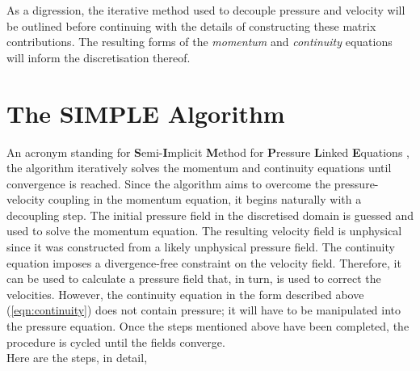 \documentclass[final,3p,times,twocolumn]{elsarticle}
\begin{document}
As a digression, the iterative method used to decouple pressure and velocity will be outlined before continuing with the details of constructing these matrix contributions. The resulting forms of the \textit{momentum} and \textit{continuity} equations will inform the discretisation thereof. 

\section{The SIMPLE Algorithm}
An acronym standing for \textbf{S}emi-\textbf{I}mplicit \textbf{M}ethod for \textbf{P}ressure \textbf{L}inked \textbf{E}quations \cite{Patankar1972AFLOWS}, the algorithm iteratively solves the momentum and continuity equations until convergence is reached. Since the algorithm aims to overcome the pressure-velocity coupling in the momentum equation, it begins naturally with a decoupling step. The initial pressure field in the discretised domain is guessed and used to solve the momentum equation. The resulting velocity field is unphysical since it was constructed from a likely unphysical pressure field. The continuity equation imposes a divergence-free constraint on the velocity field. Therefore, it can be used to calculate a pressure field that, in turn, is used to correct the velocities. However, the continuity equation in the form described above (\ref{eqn:continuity}) does not contain pressure; it will have to be manipulated into the pressure equation. Once the steps mentioned above have been completed, the procedure is cycled until the fields converge. \\ Here are the steps, in detail,
\end{document}
